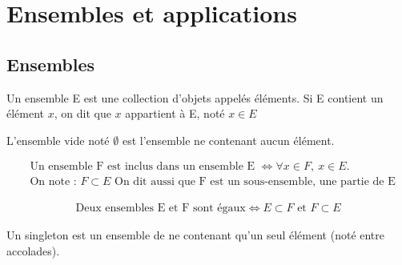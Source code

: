 \chapter{Ensembles et applications}
\section{Ensembles}

\begin{definitionbox}
    \begin{definition}
	Un ensemble E est une collection d'objets appelés éléments.
	Si E contient un élément $x$, on dit que $x$ appartient à E, noté $x \in E$ 
\end{definition}
\end{definitionbox}

\begin{definitionbox}
    \begin{definition}
	L'ensemble vide noté $\emptyset$ est l'ensemble ne contenant aucun élément.
\end{definition}
\end{definitionbox}

\begin{definitionbox}
    \begin{definition}[Inclusion]
	\begin{align*}
		&\text{Un ensemble F est inclus dans un ensemble E } \iff \forall x \in F,\ x \in E. \\
		&\text{On note : } F \subset E \text{ On dit aussi que F est un sous-ensemble, une partie de E}
	\end{align*}
\end{definition}
\end{definitionbox}

\begin{definitionbox}
    \begin{definition}
	\begin{align*}
		\text{Deux ensembles E et F sont égaux} \iff E \subset F \text{ et } F \subset E
	\end{align*} 
\end{definition}
\end{definitionbox}

\begin{definitionbox}
\begin{definition}[Singleton]
	Un singleton est un ensemble de ne contenant qu'un seul élément (noté entre accolades).
\end{definition}
\end{definitionbox}

